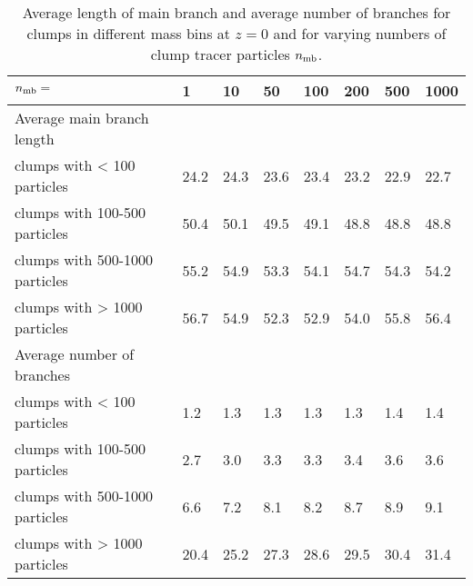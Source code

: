 \begin{table*}
  \caption{Average length of main branch and average number of
    branches for clumps in different mass bins at $z=0$ and for
    varying numbers of clump tracer particles $n_{\rm mb}$.}
  \label{tab:ntracers}
  
  {\small 
    \begin{tabular}[c]{l | p{1cm} | p{1cm} | p{1cm} | p{1cm} | p{1cm} | p{1cm} | p{1cm} |}
      $n_{\rm mb}=$				&	1 		& 	10 		& 	50 		& 	100 	& 200 	& 500 		& 1000 \\
      \hline
      Average main branch length & & & & & & &\\
      clumps with < 100 particles		&	24.2	& 	24.3	& 	23.6	&	23.4 	& 23.2 	& 22.9 	& 22.7  \\	
      clumps with 100-500 particles		&	50.4	& 	50.1	& 	49.5	&	49.1 	& 48.8 	& 48.8 	& 48.8  \\	
      clumps with 500-1000 particles		&	55.2	& 	54.9	& 	53.3	&	54.1 	& 54.7 	& 54.3 	& 54.2  \\	
      clumps with > 1000 particles		&	56.7	& 	54.9 	& 	52.3	&	52.9 	& 54.0 	& 55.8 	& 56.4  \\
      \hline
      Average number of branches & & & & & & &\\
      clumps with < 100 particles		&	1.2	& 	1.3	& 	1.3	&	1.3 	& 1.3  & 1.4 	& 1.4  \\	
      clumps with 100-500 particles		&	2.7	& 	3.0	& 	3.3	&	3.3 	& 3.4  & 3.6 	& 3.6  \\	
      clumps with 500-1000 particles		&	6.6	& 	7.2	& 	8.1	&	8.2 	& 8.7  & 8.9 	& 9.1  \\	
      clumps with > 1000 particles		&	20.4& 	25.2& 	27.3&	28.6 	& 29.5 & 30.4 	& 31.4 \\	
      \hline	
    \end{tabular}
  }
  

\end{table*}
